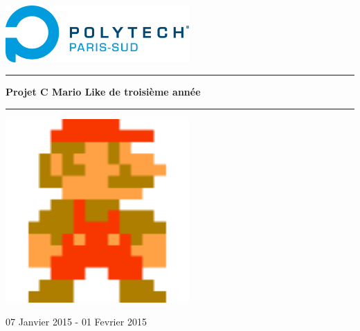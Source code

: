 \begin{titlepage}
~\\[1cm]
\begin{center}
 \includegraphics[width=7cm]{logoPolytech.jpg}~\\[1.5cm]
 \end{center}
 \hrule
	\begin{center}
	{ \huge \bfseries Projet C Mario Like de troisième année\\[0.4cm] }
	\hrule
	\end{center}
	\begin{center}
 \includegraphics[width=7cm]{marioIcon.png}~\\[1.5cm]
 \end{center}
\vfill
\begin{center}
	07 Janvier 2015 - 01 Fevrier 2015
\end{center}
\end{titlepage}
